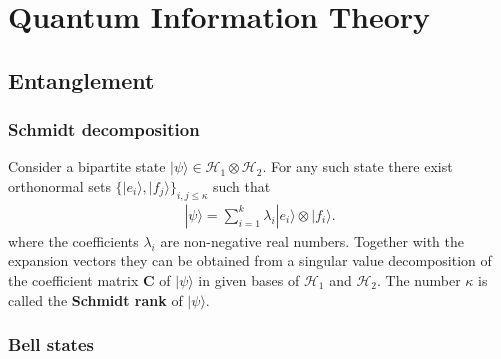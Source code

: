 \chapter{Quantum Information Theory}\label{chapter:quantum_computing}

\section{Entanglement}
\subsection{Schmidt decomposition}

    \begin{construct}
        Consider a bipartite state $|\psi\rangle\in\mathcal{H}_1\otimes\mathcal{H}_2$. For any such state there exist orthonormal sets $\big\{|e_i\rangle, |f_j\rangle\big\}_{i,j\leq\kappa}$ such that
        \begin{gather}
            |\psi\rangle = \sum_{i=1}^k\lambda_i|e_i\rangle\otimes|f_i\rangle.
        \end{gather}
        where the coefficients $\lambda_i$ are non-negative real numbers. Together with the expansion vectors they can be obtained from a singular value decomposition of the coefficient matrix $\mathbf{C}$ of $|\psi\rangle$ in given bases of $\mathcal{H}_1$ and $\mathcal{H}_2$. The number $\kappa$ is called the \textbf{Schmidt rank} of $|\psi\rangle$.
    \end{construct}


\subsection{Bell states}

